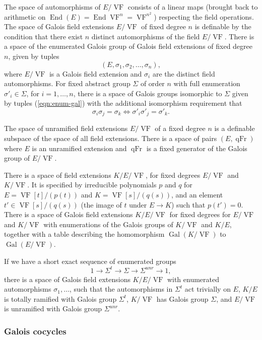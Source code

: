 \documentclass[12pt]{amsart}
\newcommand{\op}[1]{\operatorname{#1}}
\def\VF{{\op{VF}}}
\theoremstyle{plain}
\theoremstyle{definition}
\begin{document}
The space of automorphisms of $E/\VF$ consists of a linear maps
(brought back to arithmetic on $\op{End}(E) = \op{End}{\VF^n} =
\VF^{n^2}$) respecting the field operations.  The space of Galois
field extensions $E/\VF$ of fixed degree $n$ is definable by the
condition that there exist $n$ distinct automorphisms of the field
$E/\VF$.  There is a space of the enumerated Galois group of Galois
field extensions of fixed degree $n$, given by tuples
\begin{equation}\label{eqn:enum-gal}
(E,\sigma_1,\sigma_2,\ldots,\sigma_n),
\end{equation}
where $E/\VF$ is a Galois field extension and $\sigma_i$ are the
distinct field automorphisms.  For fixed abstract group $\Sigma$ of
order $n$ with full enumeration $\sigma'_i\in \Sigma$, for
$i=1,\ldots,n$, there is a space of Galois groups isomorphic to
$\Sigma$ given by tuples (\ref{eqn:enum-gal}) with the additional
isomorphism requirement that
\[
\sigma_i\sigma_j = \sigma_k \Longleftrightarrow \sigma'_i\sigma'_j =
\sigma'_k.
\]

The space of unramified field extensions $E/\VF$ of a fixed degree $n$
is a definable subspace of the space of all field extensions.  There
is a space of pairs $(E,\op{qFr})$ where $E$ is an unramified extension
and $\op{qFr}$ is a fixed generator of the Galois group of $E/\VF$.  

There is a space of field extensions $K/E/\VF$, for fixed degrees
$E/\VF$ and $K/\VF$.  It is specified by irreducible polynomials
$p$ and $q$ for $E = \VF[t]/(p(t))$ and $K = \VF[s]/(q(s))$, and an
element $t'\in \VF[s]/(q(s))$ (the image of $t$ under $E\to K$) such
that $p(t') = 0$.  There is a space of Galois field extensions
$K/E/\VF$ for fixed degrees for $E/\VF$ and $K/\VF$ with enumerations
of the Galois groups of $K/\VF$ and $K/E$, together with a table
describing the homomorphism $\op{Gal}(K/\VF)$ to $\op{Gal}(E/\VF)$.

If we have a short exact sequence of enumerated groups 
\[
1 \to \Sigma^t \to \Sigma \to \Sigma^{unr}\to 1,
\]
there is a space of Galois field extensions $K/E/\VF$ with enumerated
automorphisms $\sigma_1,\ldots$, such that the automorphisms in
$\Sigma^t$ act trivially on $E$, $K/E$ is totally ramified with Galois
group $\Sigma^t$, $K/\VF$ has Galois group $\Sigma$, and $E/\VF$ is
unramified with Galois group $\Sigma^{unr}$.

\subsubsection{Galois cocycles}
\end{document}
